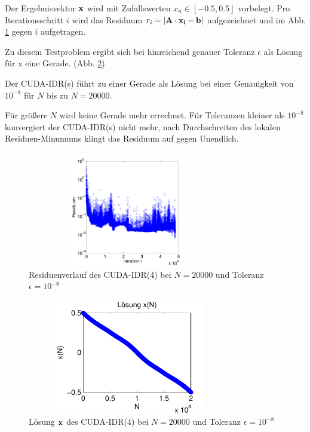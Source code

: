 \documentclass[journal]{IEEEtran}
\begin{document}
Der Ergebnisvektor $\bf x$ wird mit Zufallswerten $x_n  \in [-0.5, 0.5]$ vorbelegt.
Pro Iterationsschritt $i$ wird das Residuum $r_i = | \bf{A} \cdot \bf{x_i} - \bf b |$ aufgezeichnet und
im Abb. \ref{residuum}  gegen $i$ aufgetragen.

Zu diesem Testproblem ergibt sich bei hinreichend genauer Toleranz $\epsilon$ als Lösung
für x eine Gerade. (Abb. \ref{solutionx})

Der CUDA-IDR(s) führt zu einer Gerade als Lösung bei einer Genauigkeit von $10^{-8}$
für $N$ bis zu $N=20000$.

Für größere $N$ wird keine Gerade mehr errechnet.
Für Toleranzen kleiner als $10^{-8}$ konvergiert der CUDA-IDR(s)
nicht mehr, nach Durchschreiten des lokalen Residuen-Minumums
klingt das Residuum auf gegen Unendlich.

\begin{figure}[htbp]

   \includegraphics[width=9cm, height=5cm]{solver/0310/20000_8.pdf}

   \caption{ \label{residuum} Residuenverlauf des CUDA-IDR(4) bei $N=20000$ und Toleranz $ \epsilon = 10^{-8}$  }%

\end{figure}


\begin{figure}[htbp]

   \includegraphics[width=9cm, height=5cm]{solver/x20000.pdf}

   \caption{ \label{solutionx} Lösung $\bf x$ des CUDA-IDR(4) bei $N=20000$ und Toleranz $ \epsilon = 10^{-8}$  }%

\end{figure}
\end{document}

